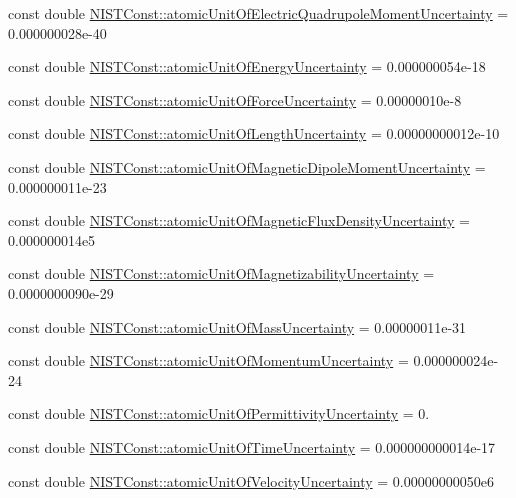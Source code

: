 \begin{DoxyCompactItemize}
\item 
const double \hyperlink{group___n_i_s_t_const-_atomic_unit_gad42ce210c0b077347928b32c3d9357f3}{N\+I\+S\+T\+Const\+::atomic\+Unit\+Of\+Electric\+Quadrupole\+Moment\+Uncertainty} = 0.\+000000028e-\/40
\item 
const double \hyperlink{group___n_i_s_t_const-_atomic_unit_ga9ae5ae472d1398b66893dd3c71604fcf}{N\+I\+S\+T\+Const\+::atomic\+Unit\+Of\+Energy\+Uncertainty} = 0.\+000000054e-\/18
\item 
const double \hyperlink{group___n_i_s_t_const-_atomic_unit_ga54668463e376aa9eeba6c13441d2d208}{N\+I\+S\+T\+Const\+::atomic\+Unit\+Of\+Force\+Uncertainty} = 0.\+00000010e-\/8
\item 
const double \hyperlink{group___n_i_s_t_const-_atomic_unit_gafc60ae3e5ac09e358e8c6fdf1358e592}{N\+I\+S\+T\+Const\+::atomic\+Unit\+Of\+Length\+Uncertainty} = 0.\+00000000012e-\/10
\item 
const double \hyperlink{group___n_i_s_t_const-_atomic_unit_gaca6d7da7bbbf63b529e97916ce72239a}{N\+I\+S\+T\+Const\+::atomic\+Unit\+Of\+Magnetic\+Dipole\+Moment\+Uncertainty} = 0.\+000000011e-\/23
\item 
const double \hyperlink{group___n_i_s_t_const-_atomic_unit_ga8f5dccf4f14d5b1255acd282165808c0}{N\+I\+S\+T\+Const\+::atomic\+Unit\+Of\+Magnetic\+Flux\+Density\+Uncertainty} = 0.\+000000014e5
\item 
const double \hyperlink{group___n_i_s_t_const-_atomic_unit_ga660abcd5b236c672a4f71398bc4894b6}{N\+I\+S\+T\+Const\+::atomic\+Unit\+Of\+Magnetizability\+Uncertainty} = 0.\+0000000090e-\/29
\item 
const double \hyperlink{group___n_i_s_t_const-_atomic_unit_gaa9459757651cf86d89e722db9911b0e1}{N\+I\+S\+T\+Const\+::atomic\+Unit\+Of\+Mass\+Uncertainty} = 0.\+00000011e-\/31
\item 
const double \hyperlink{group___n_i_s_t_const-_atomic_unit_ga1caee1ebff58bd1dbd998d78c23f0f98}{N\+I\+S\+T\+Const\+::atomic\+Unit\+Of\+Momentum\+Uncertainty} = 0.\+000000024e-\/24
\item 
const double \hyperlink{group___n_i_s_t_const-_atomic_unit_gaeaf886d76aaf96540bcf9f633fdefd6c}{N\+I\+S\+T\+Const\+::atomic\+Unit\+Of\+Permittivity\+Uncertainty} = 0.
\item 
const double \hyperlink{group___n_i_s_t_const-_atomic_unit_ga18e7346fb75798ae9f339c99b3852950}{N\+I\+S\+T\+Const\+::atomic\+Unit\+Of\+Time\+Uncertainty} = 0.\+000000000014e-\/17
\item 
const double \hyperlink{group___n_i_s_t_const-_atomic_unit_ga519034dfac791b4fd441640dd6859c2e}{N\+I\+S\+T\+Const\+::atomic\+Unit\+Of\+Velocity\+Uncertainty} = 0.\+00000000050e6
\end{DoxyCompactItemize}


